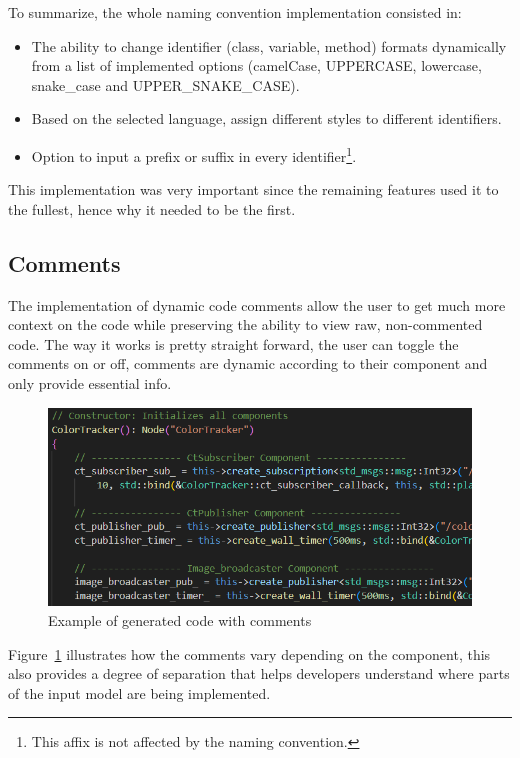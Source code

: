 To summarize, the whole naming convention implementation consisted in:

\begin{itemize} 
	\item The ability to change identifier (class, variable, method) formats dynamically from a list of implemented options (camelCase, UPPERCASE, lowercase, snake\_case and UPPER\_SNAKE\_CASE).
	\item Based on the selected language, assign different styles to different identifiers.
	\item Option to input a prefix or suffix in every identifier\footnote{This affix is not affected by the naming convention.}.
\end{itemize}

This implementation was very important since the remaining features used it to the fullest, hence why it needed to be the first.


\subsection{Comments}
\label{sec:impl_comments}

The implementation of dynamic code comments allow the user to get much more context on the code while preserving the ability to view raw, non-commented code. The way it works is pretty straight forward, the user can toggle the comments on or off, comments are dynamic according to their component and only provide essential info.

\begin{figure}[htbp]
	\centering
	\includegraphics[width=\textwidth]{comments.png}
	\caption{Example of generated code with comments}
	\label{fig:comment}
\end{figure}

Figure~\ref{fig:comment} illustrates how the comments vary depending on the component, this also provides a degree of separation that helps developers understand where parts of the input model are being implemented.

